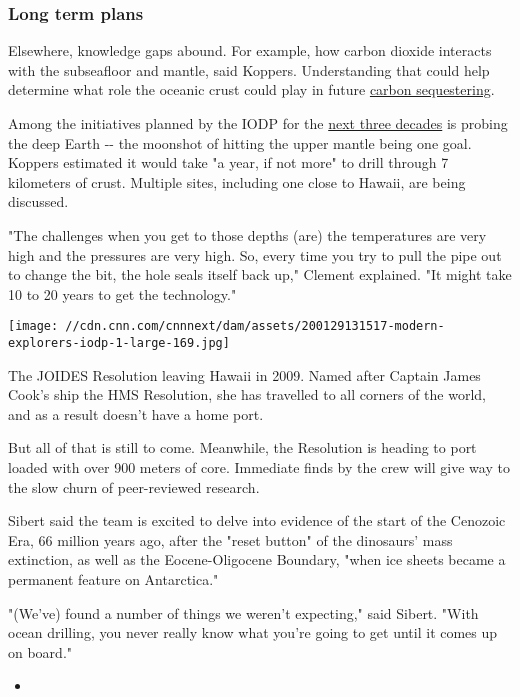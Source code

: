 \hypertarget{long-term-plans}{%
\subsubsection{Long term plans}\label{long-term-plans}}

Elsewhere, knowledge gaps abound. For example, how carbon dioxide
interacts with the subseafloor and mantle, said Koppers. Understanding
that could help determine what role the oceanic crust could play in
future
\href{https://cnn.com/2018/11/09/health/bioenergy-carbon-capture-climate/index.html}{carbon
sequestering}.

Among the initiatives planned by the IODP for the
\href{http://www.iodp.org/iodp-science-plan/664-science-framework-structure-and-roadmap-document/file}{next
three decades} is probing the deep Earth -\/- the moonshot of hitting
the upper mantle being one goal. Koppers estimated it would take "a
year, if not more" to drill through 7 kilometers of crust. Multiple
sites, including one close to Hawaii, are being discussed.

"The challenges when you get to those depths (are) the temperatures are
very high and the pressures are very high. So, every time you try to
pull the pipe out to change the bit, the hole seals itself back up,"
Clement explained. "It might take 10 to 20 years to get the technology."

\texttt{[image: //cdn.cnn.com/cnnnext/dam/assets/200129131517-modern-explorers-iodp-1-large-169.jpg]}

The JOIDES Resolution leaving Hawaii in 2009. Named after Captain James
Cook's ship the HMS Resolution, she has travelled to all corners of the
world, and as a result doesn't have a home port.

But all of that is still to come. Meanwhile, the Resolution is heading
to port loaded with over 900 meters of core. Immediate finds by the crew
will give way to the slow churn of peer-reviewed research.

Sibert said the team is excited to delve into evidence of the start of
the Cenozoic Era, 66 million years ago, after the "reset button" of the
dinosaurs' mass extinction, as well as the Eocene-Oligocene Boundary,
"when ice sheets became a permanent feature on Antarctica."

"(We've) found a number of things we weren't expecting," said Sibert.
"With ocean drilling, you never really know what you're going to get
until it comes up on board."

\begin{itemize}
\item
\end{itemize}

